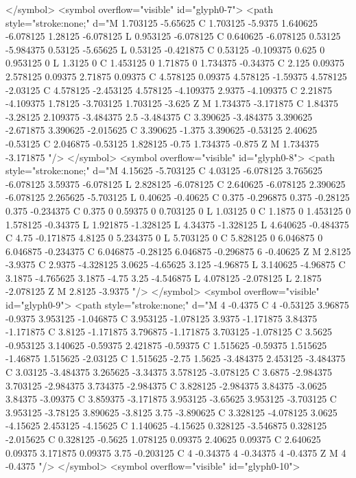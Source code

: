 </symbol>
<symbol overflow="visible" id="glyph0-7">
<path style="stroke:none;" d="M 1.703125 -5.65625 C 1.703125 -5.9375 1.640625 -6.078125 1.28125 -6.078125 L 0.953125 -6.078125 C 0.640625 -6.078125 0.53125 -5.984375 0.53125 -5.65625 L 0.53125 -0.421875 C 0.53125 -0.109375 0.625 0 0.953125 0 L 1.3125 0 C 1.453125 0 1.71875 0 1.734375 -0.34375 C 2.125 0.09375 2.578125 0.09375 2.71875 0.09375 C 4.578125 0.09375 4.578125 -1.59375 4.578125 -2.03125 C 4.578125 -2.453125 4.578125 -4.109375 2.9375 -4.109375 C 2.21875 -4.109375 1.78125 -3.703125 1.703125 -3.625 Z M 1.734375 -3.171875 C 1.84375 -3.28125 2.109375 -3.484375 2.5 -3.484375 C 3.390625 -3.484375 3.390625 -2.671875 3.390625 -2.015625 C 3.390625 -1.375 3.390625 -0.53125 2.40625 -0.53125 C 2.046875 -0.53125 1.828125 -0.75 1.734375 -0.875 Z M 1.734375 -3.171875 "/>
</symbol>
<symbol overflow="visible" id="glyph0-8">
<path style="stroke:none;" d="M 4.15625 -5.703125 C 4.03125 -6.078125 3.765625 -6.078125 3.59375 -6.078125 L 2.828125 -6.078125 C 2.640625 -6.078125 2.390625 -6.078125 2.265625 -5.703125 L 0.40625 -0.40625 C 0.375 -0.296875 0.375 -0.28125 0.375 -0.234375 C 0.375 0 0.59375 0 0.703125 0 L 1.03125 0 C 1.1875 0 1.453125 0 1.578125 -0.34375 L 1.921875 -1.328125 L 4.34375 -1.328125 L 4.640625 -0.484375 C 4.75 -0.171875 4.8125 0 5.234375 0 L 5.703125 0 C 5.828125 0 6.046875 0 6.046875 -0.234375 C 6.046875 -0.28125 6.046875 -0.296875 6 -0.40625 Z M 2.8125 -3.9375 C 2.9375 -4.328125 3.0625 -4.65625 3.125 -4.96875 L 3.140625 -4.96875 C 3.1875 -4.765625 3.1875 -4.75 3.25 -4.546875 L 4.078125 -2.078125 L 2.1875 -2.078125 Z M 2.8125 -3.9375 "/>
</symbol>
<symbol overflow="visible" id="glyph0-9">
<path style="stroke:none;" d="M 4 -0.4375 C 4 -0.53125 3.96875 -0.9375 3.953125 -1.046875 C 3.953125 -1.078125 3.9375 -1.171875 3.84375 -1.171875 C 3.8125 -1.171875 3.796875 -1.171875 3.703125 -1.078125 C 3.5625 -0.953125 3.140625 -0.59375 2.421875 -0.59375 C 1.515625 -0.59375 1.515625 -1.46875 1.515625 -2.03125 C 1.515625 -2.75 1.5625 -3.484375 2.453125 -3.484375 C 3.03125 -3.484375 3.265625 -3.34375 3.578125 -3.078125 C 3.6875 -2.984375 3.703125 -2.984375 3.734375 -2.984375 C 3.828125 -2.984375 3.84375 -3.0625 3.84375 -3.09375 C 3.859375 -3.171875 3.953125 -3.65625 3.953125 -3.703125 C 3.953125 -3.78125 3.890625 -3.8125 3.75 -3.890625 C 3.328125 -4.078125 3.0625 -4.15625 2.453125 -4.15625 C 1.140625 -4.15625 0.328125 -3.546875 0.328125 -2.015625 C 0.328125 -0.5625 1.078125 0.09375 2.40625 0.09375 C 2.640625 0.09375 3.171875 0.09375 3.75 -0.203125 C 4 -0.34375 4 -0.34375 4 -0.4375 Z M 4 -0.4375 "/>
</symbol>
<symbol overflow="visible" id="glyph0-10">
